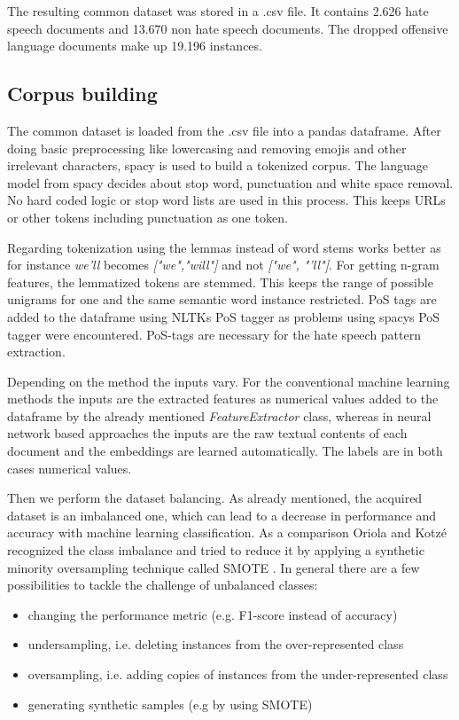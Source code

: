 The resulting common dataset was stored in a .csv file. It contains 2.626 hate speech documents and 13.670 non hate speech documents. The dropped offensive language documents make up 19.196 instances. 

\subsection{Corpus building}

The common dataset is loaded from the .csv file into a pandas dataframe. After doing basic preprocessing like lowercasing and removing emojis and other irrelevant characters, spacy is used to build a tokenized corpus. The language model from spacy decides about stop word, punctuation and white space removal. No hard coded logic or stop word lists are used in this process. This keeps URLs or other tokens including punctuation as one token. 

Regarding tokenization using the lemmas instead of word stems works better as for instance \textit{we'll} becomes \textit{["we","will"]} and not \textit{["we", "'ll"]}. For getting n-gram features, the lemmatized tokens are stemmed. This keeps the range of possible unigrams for one and the same semantic word instance restricted. PoS tags are added to the dataframe using NLTKs PoS tagger as problems using spacys PoS tagger were encountered. PoS-tags are necessary for the hate speech pattern extraction.

Depending on the method the inputs vary. For the conventional machine learning methods the inputs are the extracted features as numerical values added to the dataframe by the already mentioned \textit{Feature\-Extractor} class, whereas in neural network based approaches the inputs are the raw textual contents of each document and the embeddings are learned automatically. The labels are in both cases numerical values.

Then we perform the dataset balancing. As already mentioned, the acquired dataset is an imbalanced one, which can lead to a decrease in performance and accuracy with machine learning classification. As a comparison Oriola and Kotz\'{e} \cite{Oriola.2020} recognized the class imbalance and tried to reduce it by applying a synthetic minority oversampling technique called SMOTE \cite{Chawla2011}. In general there are a few possibilities to tackle the challenge of unbalanced classes:

\begin{itemize}
    \item changing the performance metric (e.g. F1-score instead of accuracy)
    \item undersampling, i.e. deleting instances from the over-represented class
    \item oversampling, i.e. adding copies of instances from the under-represented class
    \item generating synthetic samples (e.g by using SMOTE)
\end{itemize}


